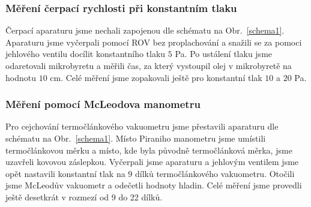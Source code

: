 \documentclass[english]{article}
\begin{document}
	\subsubsection{Měření čerpací rychlosti při konstantním tlaku}
	Čerpací aparaturu jsme nechali zapojenou dle schématu na Obr.~\ref{schema1}. Aparaturu jsme vyčerpali pomocí ROV bez proplachování a snažili se za pomoci jehlového ventilu docílit konstantního tlaku $ 5 $ Pa. Po ustálení tlaku jsme odaretovali mikrobyretu a měřili čas, za který vystoupil olej v mikrobyretě na hodnotu $ 10 $ cm. Celé měření jsme zopakovali ještě pro konstantní tlak $ 10 $ a $ 20 $ Pa.
	
	\subsubsection{Měření pomocí McLeodova manometru}
	Pro cejchování termočlánkového vakuometru jsme přestavili aparaturu dle schématu na Obr.~\ref{schema1}. Místo Piraniho manometru jsme umístili termočlánkovou měrku a místo, kde byla původně termočlánková měrka, jsme uzavřeli kovovou záslepkou. Vyčerpali jsme aparaturu a jehlovým ventilem jsme opět nastavili konstantní tlak na $ 9 $ dílků termočlánkového vakuometru. Otočili jsme McLeodův vakuometr a odečetli hodnoty hladin. Celé měření jsme provedli ještě desetkrát v rozmezí od 9 do 22 dílků.
	
\end{document}
